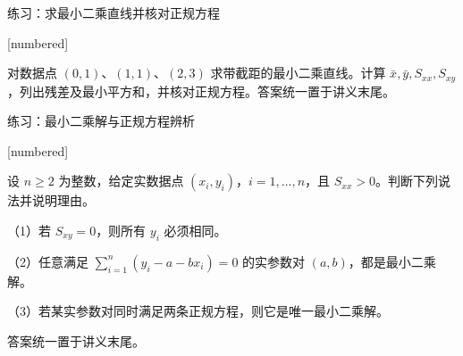 \documentclass[aspectratio=169,10pt,fontset=fandol]{ctexbeamer}
\makeatletter
\newcommand{\mathagentexerciselabelcontext}[1]{%
\hypertarget<1>{#1}{}%
\edef\@currentHref{#1}%
}
\makeatother
\begin{document}
\begin{frame}[t,fragile]{练习：求最小二乘直线并核对正规方程}
\normalsize
{\normalsize
[numbered]
\mathagentexerciselabelcontext{mathagent.exercise.U0028.0}
\begin{exercise}
\label{mathagent:exercise:332ae2e99c79cf97370ba4732967ff23f2a2c4a4b36b98eda8e910755bf43b8b}
对数据点 $(0,1)$、$(1,1)$、$(2,3)$ 求带截距的最小二乘直线。计算 $\bar{x},\bar{y},S_{xx},S_{xy}$，列出残差及最小平方和，并核对正规方程。答案统一置于讲义末尾。
\end{exercise}
}
\end{frame}
\begin{frame}[t,fragile]{练习：最小二乘解与正规方程辨析}
\normalsize
{\normalsize
[numbered]
\mathagentexerciselabelcontext{mathagent.exercise.U0029.0}
\begin{exercise}
\label{mathagent:exercise:b4c9c9a1fb82bcef052fdbf6e1539831ed88cee016dbcbf83a50e5e8d2311be0}
设 $n\geq2$ 为整数，给定实数据点 $(x_i,y_i)$，$i=1,\ldots,n$，且 $S_{xx}>0$。判断下列说法并说明理由。

（1）若 $S_{xy}=0$，则所有 $y_i$ 必须相同。

（2）任意满足 $\sum_{i=1}^{n}(y_i-a-bx_i)=0$ 的实参数对 $(a,b)$，都是最小二乘解。

（3）若某实参数对同时满足两条正规方程，则它是唯一最小二乘解。

答案统一置于讲义末尾。
\end{exercise}
}
\end{frame}
\end{document}
